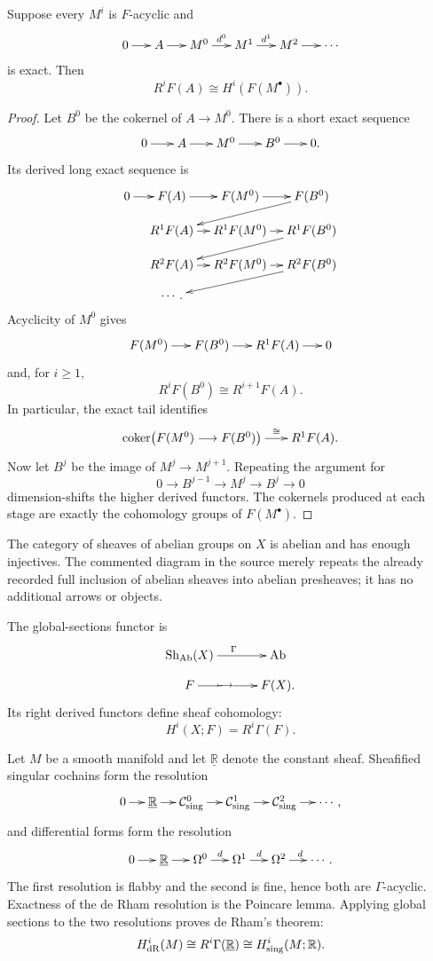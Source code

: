 \begin{proposition}
\label{at-proposition-acyclic-resolution}
Suppose every $M^i$ is $F$-acyclic and
$$
\xymatrix@C=15pt{
0\ar[r]&A\ar[r]&M^0\ar[r]^{d^0}&
M^1\ar[r]^{d^1}&M^2\ar[r]&\cdots
}
$$
is exact.  Then
$$
R^iF(A)\cong H^i(F(M^\bullet)).
$$
\end{proposition}

\begin{proof}
Let $B^0$ be the cokernel of
$A\longrightarrow M^0$.  There is a short
exact sequence
$$
\xymatrix@C=18pt{
0\ar[r]&A\ar[r]&M^0\ar[r]&B^0
\ar[r]&0.
}
$$
Its derived long exact sequence is
$$
\xymatrix@C=10pt@R=11pt{
0\ar[r]&F(A)\ar[r]&F(M^0)\ar[r]&
F(B^0)\ar[dll]\\
&R^1F(A)\ar[r]&R^1F(M^0)\ar[r]&
R^1F(B^0)\ar[dll]\\
&R^2F(A)\ar[r]&R^2F(M^0)\ar[r]&
R^2F(B^0)\ar[dll]\\
&\cdots .&&
}
$$
Acyclicity of $M^0$ gives
$$
\xymatrix@C=15pt{
F(M^0)\ar[r]&F(B^0)\ar[r]&
R^1F(A)\ar[r]&0
}
$$
and, for $i\geq1$,
$$
R^iF(B^0)\cong R^{i+1}F(A).
$$
In particular, the exact tail identifies
$$
\xymatrix@C=18pt{
\operatorname{coker}\bigl(
F(M^0)\longrightarrow F(B^0)\bigr)
\ar[r]^-{\cong}&R^1F(A).
}
$$
Now let $B^j$ be the image of
$M^j\longrightarrow M^{j+1}$.  Repeating
the argument for
$$
0\longrightarrow B^{j-1}
\longrightarrow M^j
\longrightarrow B^j
\longrightarrow0
$$
dimension-shifts the higher derived functors.
The cokernels produced at each stage are
exactly the cohomology groups of
$F(M^\bullet)$.
\end{proof}

The category of sheaves of abelian groups on
$X$ is abelian and has enough injectives.
The commented diagram in the source merely
repeats the already recorded full inclusion
of abelian sheaves into abelian presheaves;
it has no additional arrows or objects.

The global-sections functor is
$$
\xymatrix@C=32pt@R=8pt{
\operatorname{Sh}_{\operatorname{Ab}}(X)
\ar[r]^\Gamma&
\operatorname{Ab}\\
F\ar[r]|-{\hspace{-4pt}\longmapsto}&F(X).
}
$$
Its right derived functors define sheaf
cohomology:
$$
H^i(X;F)=R^i\Gamma(F).
$$

Let $M$ be a smooth manifold and let
$\underline{\mathbb{R}}$ denote the constant
sheaf.  Sheafified singular cochains form the
resolution
$$
\xymatrix@C=12pt{
0\ar[r]&\underline{\mathbb{R}}\ar[r]&
\mathcal{C}^0_{\rm sing}\ar[r]&
\mathcal{C}^1_{\rm sing}\ar[r]&
\mathcal{C}^2_{\rm sing}\ar[r]&\cdots ,
}
$$
and differential forms form the resolution
$$
\xymatrix@C=14pt{
0\ar[r]&\underline{\mathbb{R}}\ar[r]&
\Omega^0\ar[r]^d&\Omega^1\ar[r]^d&
\Omega^2\ar[r]^d&\cdots .
}
$$
The first resolution is flabby and the second
is fine, hence both are $\Gamma$-acyclic.
Exactness of the de Rham resolution is the
Poincare lemma.  Applying global sections to
the two resolutions proves de Rham's theorem:
$$
H^i_{\rm dR}(M)
\cong R^i\Gamma(\underline{\mathbb{R}})
\cong H^i_{\rm sing}(M;\mathbb{R}).
$$





